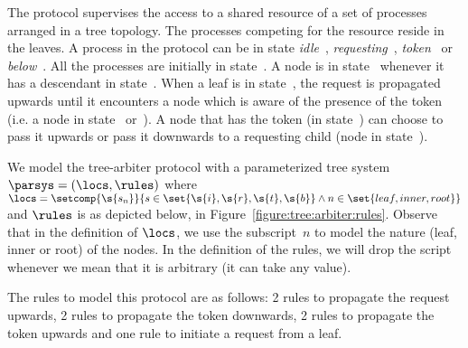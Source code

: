 
The protocol supervises the access to a shared resource of a set of
processes arranged in a tree topology.
%
The processes competing for the resource reside in the leaves.
%
A process in the protocol can be in state \emph{idle}~,
\emph{requesting}~, \emph{token}~ or
\emph{below}~.
%
All the processes are initially in state~.
%
A node is in state~ whenever it has a descendant in
state~.
%
When a leaf is in state~, the request is propagated upwards
until it encounters a node which is aware of the presence of the token
(i.e. a node in state~ or~).
%
A node that has the token (in state~) can choose to pass it
upwards or pass it downwards to a requesting child (node in
state~).
%

We model the tree-arbiter protocol with a parameterized tree system
$\parsys=(\locs,\rules)$ where
$\locs=\setcomp{\s{\ensuremath{s_n}}}{s\in\set{\s{i},\s{r},\s{t},\s{b}}\wedge
  n\in\set{leaf,inner,root}}$
and $\rules$ is as depicted below, in Figure~\ref{figure:tree:arbiter:rules}.
%
Observe that in the definition of $\locs$, we use the subscript~$n$ to
model the nature (leaf, inner or root) of the nodes.
%
In the definition of the rules, we will drop the script whenever we
mean that it is arbitrary (it can take any value).
%

The rules to model this protocol are as follows: 
%
2 rules to propagate the request upwards,
%
2 rules to propagate the token downwards, 
%
2 rules to propagate the token upwards and one rule to initiate a request from a leaf. 
%

